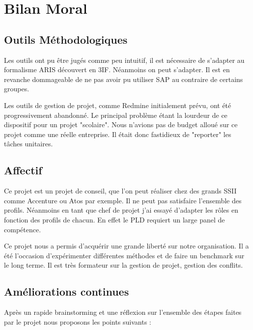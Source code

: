 \section{Bilan Moral}

\subsection{Outils Méthodologiques}

Les outils ont pu être jugés comme peu intuitif, il est nécessaire de s'adapter 
au formalisme ARIS découvert en 3IF. Néanmoins on peut s'adapter. Il est en revanche
 dommageable de ne pas avoir pu utiliser SAP au contraire de certains groupes. 

Les outils de gestion de projet, comme Redmine initialement prévu, ont été progressivement
 abandonné. Le principal problème étant la lourdeur de ce dispositif pour un projet 
"scolaire". Nous n'avions pas de budget alloué sur ce projet comme une réelle entreprise.
Il était donc fastidieux de "reporter" les tâches unitaires.

\subsection{Affectif}

Ce projet est un projet de conseil, que l'on peut réaliser chez des grands SSII 
comme Accenture ou Atos par exemple. Il ne peut pas satisfaire l'ensemble des profils. 
Néanmoins en tant que chef de projet j'ai essayé d'adapter les rôles en fonction 
des profils de chacun. En effet le PLD requiert un large panel de compétence.

Ce projet nous a permis d'acquérir une grande liberté sur notre organisation. 
Il a été l'occasion d'expérimenter différentes méthodes et de faire un benchmark 
sur le long terme. Il est très formateur sur la gestion de projet, gestion des
conflits.

\subsection{Améliorations continues}

Après un rapide brainstorming et une réflexion sur l'ensemble des étapes faites 
par le projet nous proposons les points suivants : 

